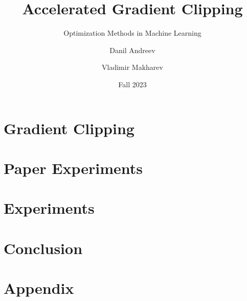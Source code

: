 \documentclass{beamer}
\title{Accelerated Gradient Clipping}
\subtitle{Optimization Methods in Machine Learning}
\author{Danil Andreev \and Vladimir Makharev}
\institute{Innopolis University}
\date{Fall 2023}
\begin{document}
\begin{frame}
    \titlepage
    \begin{figure}[htpb]
        \begin{center}
            
        \end{center}
    \end{figure}
\end{frame}

\section{Gradient Clipping}



\section{Paper Experiments}




\section{Experiments}









\section{Conclusion}


\section{Appendix}



\end{document}
